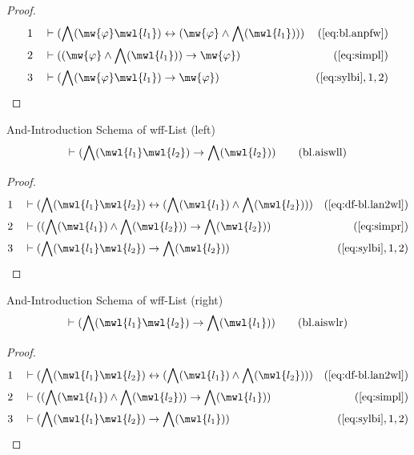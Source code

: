 \begin{proof}
\begin{align}
  1 &&  & \vdash ( \bigwedge( \mw{\varphi} \mwl{l_1} ) \leftrightarrow (
     \mw{\varphi} \wedge \bigwedge( \mwl{l_1} ) )
     )&(\mbox{\ref{eq:bl.anpfw}})\notag
  \\ 2 &&  & \vdash ( ( \mw{\varphi} \wedge \bigwedge( \mwl{l_1} ) )
     \rightarrow \mw{\varphi}
     )&(\mbox{\ref{eq:simpl}})\notag
  \\ 3 &&  & \vdash ( \bigwedge( \mw{\varphi} \mwl{l_1} ) \rightarrow
     \mw{\varphi} )&(\mbox{\ref{eq:sylbi}},1,2)\notag
\end{align}
\end{proof}

\begin{lemma} {And-Introduction Schema of wff-List
(left)}
\begin{align}
\vdash ( \bigwedge( \mwl{l_1} \mwl{l_2} ) \rightarrow \bigwedge( \mwl{l_2} )
    )\label{eq:bl.aiswll}\tag{bl.aiswll}
\end{align}
\end{lemma}


\begin{proof}
\begin{align}
  1 &&  & \vdash ( \bigwedge( \mwl{l_1} \mwl{l_2} ) \leftrightarrow (
     \bigwedge( \mwl{l_1} ) \wedge \bigwedge( \mwl{l_2} )
     ) )&(\mbox{\ref{eq:df-bl.lan2wl}})\notag
  \\ 2 &&  & \vdash ( ( \bigwedge( \mwl{l_1} ) \wedge \bigwedge( \mwl{l_2} ) )
     \rightarrow \bigwedge( \mwl{l_2} )
     )&(\mbox{\ref{eq:simpr}})\notag
  \\ 3 &&  & \vdash ( \bigwedge( \mwl{l_1} \mwl{l_2} ) \rightarrow \bigwedge(
     \mwl{l_2} ) )&(\mbox{\ref{eq:sylbi}},1,2)\notag
\end{align}
\end{proof}

\begin{lemma} {And-Introduction Schema of wff-List
(right)}
\begin{align}
\vdash ( \bigwedge( \mwl{l_1} \mwl{l_2} ) \rightarrow \bigwedge( \mwl{l_1} )
    )\label{eq:bl.aiswlr}\tag{bl.aiswlr}
\end{align}
\end{lemma}


\begin{proof}
\begin{align}
  1 &&  & \vdash ( \bigwedge( \mwl{l_1} \mwl{l_2} ) \leftrightarrow (
     \bigwedge( \mwl{l_1} ) \wedge \bigwedge( \mwl{l_2} )
     ) )&(\mbox{\ref{eq:df-bl.lan2wl}})\notag
  \\ 2 &&  & \vdash ( ( \bigwedge( \mwl{l_1} ) \wedge \bigwedge( \mwl{l_2} ) )
     \rightarrow \bigwedge( \mwl{l_1} )
     )&(\mbox{\ref{eq:simpl}})\notag
  \\ 3 &&  & \vdash ( \bigwedge( \mwl{l_1} \mwl{l_2} ) \rightarrow \bigwedge(
     \mwl{l_1} ) )&(\mbox{\ref{eq:sylbi}},1,2)\notag
\end{align}
\end{proof}

